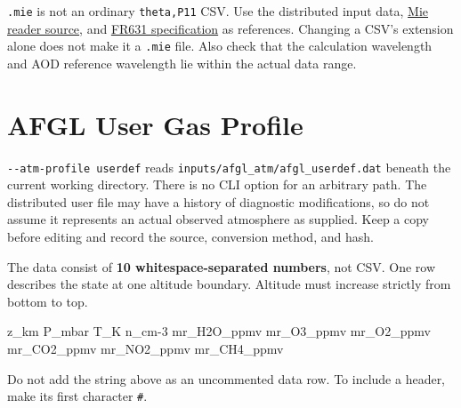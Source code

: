 \texttt{.\allowbreak{}mie} is not an ordinary \texttt{theta,\allowbreak{}P11} CSV. Use the distributed input data, \href{https://github.com/brtnt/OCRT/blob/54861c68e35ec5aaa3938fad53e93dc2dfa7eb1d/code/OCRT_C/src/shared/mie_io.c}{Mie reader source}, and \href{https://github.com/brtnt/OCRT/blob/54861c68e35ec5aaa3938fad53e93dc2dfa7eb1d/code/OCRT_C/docs/PHASE_ANGLE_GRID_FR631_SPEC_KO.md}{FR631 specification} as references. Changing a CSV's extension alone does not make it a \texttt{.\allowbreak{}mie} file. Also check that the calculation wavelength and AOD reference wavelength lie within the actual data range.

\section{AFGL User Gas Profile}
\label{sec:auto:08_input_formats:5}
\texttt{-\allowbreak{}-\allowbreak{}atm-\allowbreak{}profile userdef} reads \texttt{inputs/\allowbreak{}afgl\_\allowbreak{}atm/\allowbreak{}afgl\_\allowbreak{}userdef.\allowbreak{}dat} beneath the current working directory. There is no CLI option for an arbitrary path. The distributed user file may have a history of diagnostic modifications, so do not assume it represents an actual observed atmosphere as supplied. Keep a copy before editing and record the source, conversion method, and hash.

The data consist of \textbf{10 whitespace-separated numbers}, not CSV. One row describes the state at one altitude boundary. Altitude must increase strictly from bottom to top.


\begin{ManualCode}
z_km P_mbar T_K n_cm-3 mr_H2O_ppmv mr_O3_ppmv mr_O2_ppmv mr_CO2_ppmv mr_NO2_ppmv mr_CH4_ppmv
\end{ManualCode}

Do not add the string above as an uncommented data row. To include a header, make its first character \texttt{\#}.



